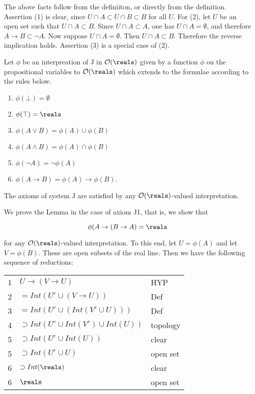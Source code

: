 The above facts follow from the definiiton, or directly from the definition.  Assertion (1) is clear, since $U \cap A \subset U \cap B \subset B$ for all $U$.  For (2), let $U$ be an open set such that $U \cap A \subset B$.  Since $U \cap A \subset A$, one has $U \cap A = \emptyset$, and therefore $A \to B \subset \neg A$.
Now suppose $U \cap A = \emptyset$.  Then $U \cap A \subset B$.  Therefore the reverse implication holds.  Assertion (3) is a special case of (2).


Let $\phi$ be an interpreation of J in $\opensets(\reals)$ given by a function $\phi$ on the propositional variables to $\opensets(\reals)$ which extends to the formulae according to the
rules below.

\begin{enumerate}

\item $\phi(\bot) = \emptyset$

\item $\phi(\top) = \reals$

\item $\phi(A \lor B) = \phi(A) \cup \phi(B)$

\item $\phi(A \land B) = \phi(A) \cap \phi(B)$

\item $\phi(\neg A) = \neg \phi(A)$

\item $\phi(A \to B) = \phi(A) \to \phi(B)$.

\end{enumerate}

\begin{lemma} The axioms of system J are satisfied by any $\opensets(\reals)$-valued
interpretation.
\end{lemma}

We  prove the Lemma in the case of axiom J1, that is, we show that

$$
\phi(A \to (B \to A) = \reals
$$

for any $\opensets(\reals)$-valued interpretation.  To this end, let $U = \phi(A)$ and let $V = \phi(B)$.  These are open subsets of the real line.  Then we have the following sequence of reductions:

\begin{indent}
\begin{tabular}{lll}
1 & $U \to (V \to U)$ & HYP \\
2 & $= Int (U^c \cup (V \to U))$ & Def \\
3 & $= Int (U^c \cup (Int(V^c \cup U)))$ & Def \\
4 & $ \supset Int(U^c \cup Int(V^c) \cup Int(U))$ & topology \\
5 & $\supset Int(U^c \cup Int(U))$ & clear \\
5 & $\supset Int(U^c \cup U)$ & open set \\
6 & $\supset Int(\reals)$ &clear \\
6 & $\reals$ & open set \\
\end{tabular}
\end{indent}

